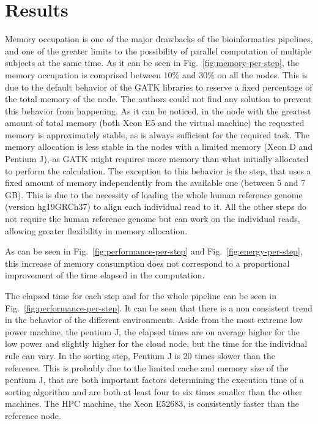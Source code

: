\documentclass{standalone}
\begin{document}
\section*{Results}

Memory occupation is one of the major drawbacks of the bioinformatics pipelines, and one of the greater limits to the possibility of parallel computation of multiple subjects at the same time.
As it can be seen in Fig.~\ref{fig:memory-per-step}, the memory occupation is comprised between 10\% and 30\% on all the nodes.
This is due to the default behavior of the GATK libraries to reserve a fixed percentage of the total memory of the node.
The authors could not find any solution to prevent this behavior from happening.
As it can be noticed, in the node with the greatest amount of total memory (both Xeon E5 and the virtual machine) the requested memory is approximately stable, as is always sufficient for the required task.
The memory allocation is less stable in the nodes with a limited memory (Xeon D and Pentium J), as GATK might requires more memory than what initially allocated to perform the calculation.
The exception to this behavior is the  step, that uses a fixed amount of memory independently from the available one (between 5 and 7 GB).
This is due to the necessity of loading the whole human reference genome (version hg19GRCh37) to align each individual read to it.
All the other steps do not require the human reference genome but can work on the individual reads, allowing greater flexibility in memory allocation.

As can be seen in Fig.~\ref{fig:performance-per-step} and Fig.~\ref{fig:energy-per-step}, this increase of memory consumption does not correspond to a proportional improvement of the time elapsed in the computation.

The elapsed time for each step and for the whole pipeline can be seen in Fig.~\ref{fig:performance-per-step}.
It can be seen that there is a non consistent trend in the behavior of the different environments.
Aside from the most extreme low power machine, the pentium J, the elapsed times are on average higher for the low power and slightly higher for the cloud node, but the time for the individual rule can vary.
In the sorting step, Pentium J is 20 times slower than the reference.
This is probably due to the limited cache and memory size of the pentium J, that are both important factors determining the execution time of a sorting algorithm and are both at least four to six times smaller than the other machines.
The HPC machine, the Xeon E52683, is consistently faster than the reference node.
\end{document}
